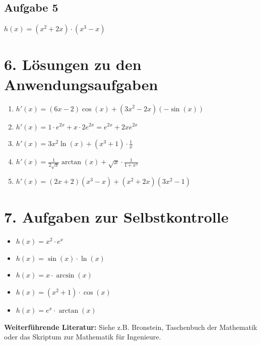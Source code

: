 \subsection*{Aufgabe 5}
$h(x) = (x^2 + 2x) \cdot (x^3 - x)$

\section*{6. Lösungen zu den Anwendungsaufgaben}
\begin{enumerate}[label=\textbf{Aufgabe \arabic*:}]
    \item $h'(x) = (6x - 2)\cos(x) + (3x^2 - 2x)(-\sin(x))$
    \item $h'(x) = 1 \cdot e^{2x} + x \cdot 2e^{2x} = e^{2x} + 2x e^{2x}$
    \item $h'(x) = 3x^2 \ln(x) + (x^3 + 1) \cdot \frac{1}{x}$
    \item $h'(x) = \frac{1}{2\sqrt{x}} \arctan(x) + \sqrt{x} \cdot \frac{1}{1+x^2}$
    \item $h'(x) = (2x+2)(x^3-x) + (x^2+2x)(3x^2-1)$
\end{enumerate}

\section*{7. Aufgaben zur Selbstkontrolle}
\begin{itemize}
    \item $h(x) = x^2 \cdot e^x$
    \item $h(x) = \sin(x) \cdot \ln(x)$
    \item $h(x) = x \cdot \arcsin(x)$
    \item $h(x) = (x^2+1) \cdot \cos(x)$
    \item $h(x) = e^x \cdot \arctan(x)$
\end{itemize}

\vfill
\textbf{Weiterführende Literatur:} Siehe z.B. Bronstein, Taschenbuch der Mathematik oder das Skriptum zur Mathematik für Ingenieure.

